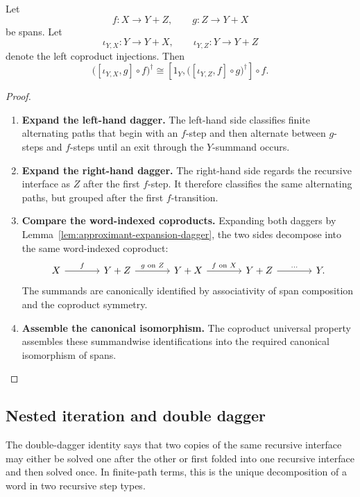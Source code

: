 \begin{theorem}[Sliding]
\label{thm:conway-sliding-feedback}
Let
\[
  f:X\to Y+Z,
  \qquad
  g:Z\to Y+X
\]
be spans. Let
\[
  \iota_{Y,X}:Y\to Y+X,
  \qquad
  \iota_{Y,Z}:Y\to Y+Z
\]
denote the left coproduct injections. Then
\[
  \bigl([\iota_{Y,X},g]\circ f\bigr)^\dagger
  \cong
  [1_Y,\bigl([\iota_{Y,Z},f]\circ g\bigr)^\dagger]\circ f.
\]
\end{theorem}

\begin{proof}
\begin{enumerate}
  \item \textbf{Expand the left-hand dagger.}
  The left-hand side classifies finite alternating paths that begin with an
  \(f\)-step and then alternate between \(g\)-steps and \(f\)-steps until an
  exit through the \(Y\)-summand occurs.

  \item \textbf{Expand the right-hand dagger.}
  The right-hand side regards the recursive interface as \(Z\) after the
  first \(f\)-step. It therefore classifies the same alternating paths, but
  grouped after the first \(f\)-transition.

  \item \textbf{Compare the word-indexed coproducts.}
  Expanding both daggers by
  Lemma~\ref{lem:approximant-expansion-dagger}, the two sides decompose into
  the same word-indexed coproduct:
  \[
  \begin{tikzcd}[column sep=large,row sep=large]
    X
      \ar[r,"f"]
    &
    Y+Z
      \ar[r,"g\text{ on }Z"]
    &
    Y+X
      \ar[r,"f\text{ on }X"]
    &
    Y+Z
      \ar[r,"\cdots"]
    &
    Y .
  \end{tikzcd}
  \]
  The summands are canonically identified by associativity of span
  composition and the coproduct symmetry.

  \item \textbf{Assemble the canonical isomorphism.}
  The coproduct universal property assembles these summandwise
  identifications into the required canonical isomorphism of spans.
\end{enumerate}
\end{proof}

\subsection{Nested iteration and double dagger}
\label{subsec:dagger-double-feedback}

The double-dagger identity says that two copies of the same recursive
interface may either be solved one after the other or first folded into one
recursive interface and then solved once. In finite-path terms, this is the
unique decomposition of a word in two recursive step types.

